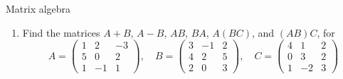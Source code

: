 \documentclass[9pt]{beamer}
\begin{document}
\begin{frame}{Matrix algebra}
\begin{enumerate}[leftmargin = 0.35cm, label = \arabic*., rightmargin = 0.2cm]
        \item Find the matrices $A + B$, $A - B$, $AB$, $BA$, $A(BC)$, and $(AB)C$, for
        $$
        A = 
        \begin{pmatrix}
        1 & 2  & -3 \\
        5 & 0  & 2 \\
        1 & -1 & 1
        \end{pmatrix},\quad 
        B = 
        \begin{pmatrix}
        3 & -1 & 2 \\
        4 & 2  & 5 \\
        2 & 0  & 3
        \end{pmatrix},\quad
        C = 
        \begin{pmatrix}
        4 & 1  & 2 \\
        0 & 3  & 2 \\
        1 & -2 & 3
        \end{pmatrix}
        $$
        
    \end{enumerate}
    
\end{frame}
\end{document}
